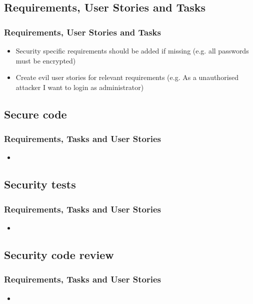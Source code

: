 \documentclass{beamer}
\begin{document}
\subsection{Requirements, User Stories and Tasks}
\begin{frame}
\frametitle{Requirements, User Stories and Tasks}
\begin{itemize}
  \item Security specific requirements should be added if missing (e.g. all passwords must be encrypted)
  \item Create evil user stories for relevant requirements (e.g. As a unauthorised attacker I want to login as administrator)
\end{itemize}
\end{frame}

\subsection{Secure code}
\begin{frame}
\frametitle{Requirements, Tasks and User Stories}
\begin{itemize}
\item
\end{itemize}
\end{frame}

\subsection{Security tests}
\begin{frame}
\frametitle{Requirements, Tasks and User Stories}
\begin{itemize}
\item
\end{itemize}
\end{frame}

\subsection{Security code review}
\begin{frame}
\frametitle{Requirements, Tasks and User Stories}
\begin{itemize}
\item
\end{itemize}
\end{frame}
\end{document}
